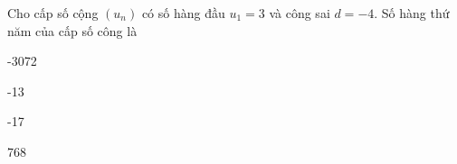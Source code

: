 \begin{question}[type=multiple_choice,difficulty=1,code={I-3}]
Cho cấp số cộng $ (u_n) $ có số hàng đầu $ u_1 = 3 $ và công sai $ d = -4 $. Số hàng thứ năm của cấp số công là

\begin{choice}[label=A]
-3072
\end{choice}

\begin{choice}[correct,label=B]
-13
\end{choice}

\begin{choice}[label=C]
-17
\end{choice}

\begin{choice}[label=D]
768
\end{choice}

\end{question}